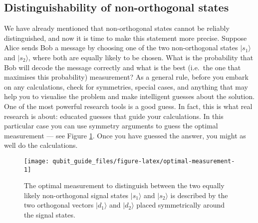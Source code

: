 \documentclass[fleqn]{article}
\begin{document}
\hypertarget{distinguishability-of-non-orthogonal-states}{%
\subsection{Distinguishability of non-orthogonal states}\label{distinguishability-of-non-orthogonal-states}}

We have already mentioned that non-orthogonal states cannot be reliably distinguished, and now it is time to make this statement more precise.
Suppose Alice sends Bob a message by choosing one of the two non-orthogonal states \(|s_1\rangle\) and \(|s_2\rangle\), where both are equally likely to be chosen.
What is the probability that Bob will decode the message correctly and what is the best (i.e.~the one that maximises this probability) measurement?
As a general rule, before you embark on any calculations, check for symmetries, special cases, and anything that may help you to visualise the problem and make intelligent guesses about the solution.
One of the most powerful research tools is a good guess.
In fact, this is what real research is about: educated guesses that guide your calculations.
In this particular case you can use symmetry arguments to guess the optimal measurement --- see Figure \ref{fig:optimal-measurement}.
Once you have guessed the answer, you might as well do the calculations.



\begin{figure}[H]

{\centering \texttt{[image: qubit\_guide\_files/figure-latex/optimal-measurement-1]} 

}

\caption{The optimal measurement to distinguish between the two equally likely non-orthogonal signal states \(|s_1\rangle\) and \(|s_2\rangle\) is described by the two orthogonal vectors \(|d_1\rangle\) and \(|d_2\rangle\) placed symmetrically around the signal states.}\label{fig:optimal-measurement}
\end{figure}
\end{document}
